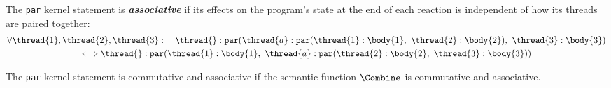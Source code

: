 \begin{definition}
	\label{def:associative_par}
	The \verb$par$ kernel statement is \emph{\textbf{associative}} if its effects 
	on the program's state at the end of each reaction is independent of how its 
	threads are paired together:
	\begin{multline*}
		\forall \thread{1}, \thread{2}, \thread{3}:
		\quad
		\thread{}:\mathtt{par}(\thread{a}:\mathtt{par}(\thread{1}:\body{1},~\thread{2}:\body{2}),~\thread{3}:\body{3})	\\
		\Longleftrightarrow
		\thread{}:\mathtt{par}(\thread{1}:\body{1},~\thread{a}:\mathtt{par}(\thread{2}:\body{2},~\thread{3}:\body{3}))
	\end{multline*}
\end{definition}

\begin{theorem}
	\label{thm:commute_associate_par}
	The \verb$par$ kernel statement is commutative and associative if the 
	semantic function $\Combine$ is commutative and associative.
\end{theorem}
